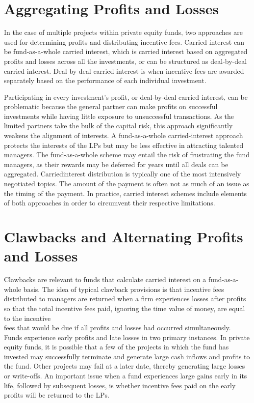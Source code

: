 \documentclass[11pt]{article}
\begin{document}
\section*{Aggregating Profits and Losses}
In the case of multiple projects within private equity funds, two approaches are used for determining profits and distributing incentive fees. Carried interest can be fund-as-a-whole carried interest, which is carried interest based on aggregated profits and losses across all the investments, or can be structured as deal-by-deal carried interest. Deal-by-deal carried interest is when incentive fees are awarded separately based on the performance of each individual investment.

Participating in every investment's profit, or deal-by-deal carried interest, can be problematic because the general partner can make profits on successful investments while having little exposure to unsuccessful transactions. As the limited partners take the bulk of the capital risk, this approach significantly weakens the alignment of interests. A fund-as-a-whole carried-interest approach protects the interests of the LPs but may be less effective in attracting talented managers. The fund-as-a-whole scheme may entail the risk of frustrating the fund managers, as their rewards may be deferred for years until all deals can be aggregated. Carriedinterest distribution is typically one of the most intensively negotiated topics. The amount of the payment is often not as much of an issue as the timing of the payment. In practice, carried interest schemes include elements of both approaches in order to circumvent their respective limitations.

\section*{Clawbacks and Alternating Profits and Losses}
Clawbacks are relevant to funds that calculate carried interest on a fund-as-a-whole basis. The idea of typical clawback provisions is that incentive fees distributed to managers are returned when a firm experiences losses after profits so that the total incentive fees paid, ignoring the time value of money, are equal to the incentive\\
fees that would be due if all profits and losses had occurred simultaneously. Funds experience early profits and late losses in two primary instances. In private equity funds, it is possible that a few of the projects in which the fund has invested may successfully terminate and generate large cash inflows and profits to the fund. Other projects may fail at a later date, thereby generating large losses or write-offs. An important issue when a fund experiences large gains early in its life, followed by subsequent losses, is whether incentive fees paid on the early profits will be returned to the LPs.
\end{document}
